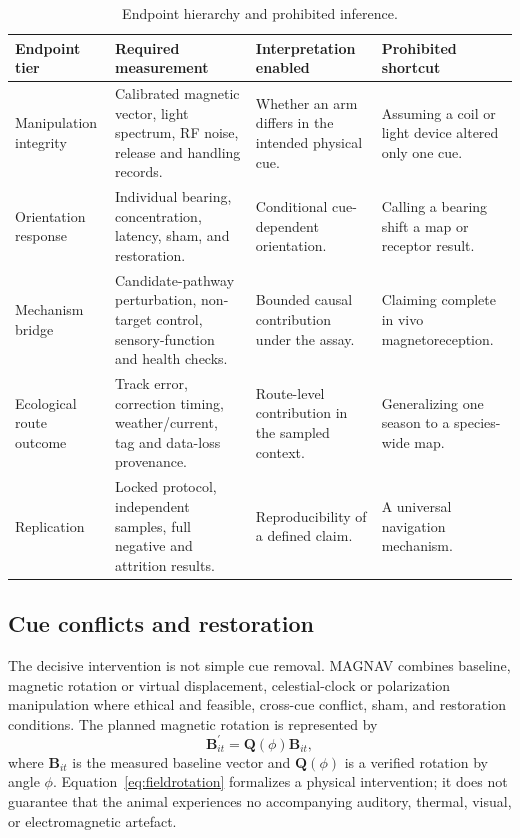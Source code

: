 \documentclass[conference]{IEEEtran}
\begin{document}
\begin{table}[!t]
\caption{Endpoint hierarchy and prohibited inference.}\label{tab:endpoints}\centering\footnotesize
\begin{tabular}{@{}L{.19\textwidth}L{.25\textwidth}L{.25\textwidth}L{.23\textwidth}@{}}\toprule
Endpoint tier & Required measurement & Interpretation enabled & Prohibited shortcut\\\midrule
Manipulation integrity & Calibrated magnetic vector, light spectrum, RF noise, release and handling records. & Whether an arm differs in the intended physical cue. & Assuming a coil or light device altered only one cue.\\
Orientation response & Individual bearing, concentration, latency, sham, and restoration. & Conditional cue-dependent orientation. & Calling a bearing shift a map or receptor result.\\
Mechanism bridge & Candidate-pathway perturbation, non-target control, sensory-function and health checks. & Bounded causal contribution under the assay. & Claiming complete in vivo magnetoreception.\\
Ecological route outcome & Track error, correction timing, weather/current, tag and data-loss provenance. & Route-level contribution in the sampled context. & Generalizing one season to a species-wide map.\\
Replication & Locked protocol, independent samples, full negative and attrition results. & Reproducibility of a defined claim. & A universal navigation mechanism.\\\bottomrule
\end{tabular}
\end{table}

\subsection{Cue conflicts and restoration}
The decisive intervention is not simple cue removal. MAGNAV combines baseline, magnetic rotation or virtual displacement, celestial-clock or polarization manipulation where ethical and feasible, cross-cue conflict, sham, and restoration conditions. The planned magnetic rotation is represented by
\begin{equation}
\mathbf{B}^{\prime}_{it}=\mathbf{Q}(\phi)\mathbf{B}_{it},
\label{eq:fieldrotation}
\end{equation}
where $\mathbf{B}_{it}$ is the measured baseline vector and $\mathbf{Q}(\phi)$ is a verified rotation by angle $\phi$. Equation~\eqref{eq:fieldrotation} formalizes a physical intervention; it does not guarantee that the animal experiences no accompanying auditory, thermal, visual, or electromagnetic artefact.
\end{document}
